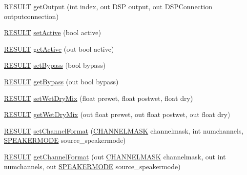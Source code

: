 \begin{DoxyCompactItemize}
\item 
\hyperlink{namespace_f_m_o_d_a305d1176ef3f8c8815861a60407ac33d}{R\+E\+S\+U\+LT} \hyperlink{class_f_m_o_d_1_1_d_s_p_ab9a4ff367880a3f11f0d9fd1b13b6471}{get\+Output} (int index, out \hyperlink{class_f_m_o_d_1_1_d_s_p}{D\+SP} output, out \hyperlink{class_f_m_o_d_1_1_d_s_p_connection}{D\+S\+P\+Connection} outputconnection)
\item 
\hyperlink{namespace_f_m_o_d_a305d1176ef3f8c8815861a60407ac33d}{R\+E\+S\+U\+LT} \hyperlink{class_f_m_o_d_1_1_d_s_p_a4550289d35ae8cbc8705b6336b8f9442}{set\+Active} (bool active)
\item 
\hyperlink{namespace_f_m_o_d_a305d1176ef3f8c8815861a60407ac33d}{R\+E\+S\+U\+LT} \hyperlink{class_f_m_o_d_1_1_d_s_p_a23023e1c53c97ab3a1931a4ec5a9ea5c}{get\+Active} (out bool active)
\item 
\hyperlink{namespace_f_m_o_d_a305d1176ef3f8c8815861a60407ac33d}{R\+E\+S\+U\+LT} \hyperlink{class_f_m_o_d_1_1_d_s_p_a4168480afea4775637ed9443046de78f}{set\+Bypass} (bool bypass)
\item 
\hyperlink{namespace_f_m_o_d_a305d1176ef3f8c8815861a60407ac33d}{R\+E\+S\+U\+LT} \hyperlink{class_f_m_o_d_1_1_d_s_p_a5fd30b33615332c87ed8f19975f910a5}{get\+Bypass} (out bool bypass)
\item 
\hyperlink{namespace_f_m_o_d_a305d1176ef3f8c8815861a60407ac33d}{R\+E\+S\+U\+LT} \hyperlink{class_f_m_o_d_1_1_d_s_p_a1e4aa96dc5b5082f506adbb913c1bc6f}{set\+Wet\+Dry\+Mix} (float prewet, float postwet, float dry)
\item 
\hyperlink{namespace_f_m_o_d_a305d1176ef3f8c8815861a60407ac33d}{R\+E\+S\+U\+LT} \hyperlink{class_f_m_o_d_1_1_d_s_p_ae5fffc548d67b21ba56c0c678e7d3a78}{get\+Wet\+Dry\+Mix} (out float prewet, out float postwet, out float dry)
\item 
\hyperlink{namespace_f_m_o_d_a305d1176ef3f8c8815861a60407ac33d}{R\+E\+S\+U\+LT} \hyperlink{class_f_m_o_d_1_1_d_s_p_a9e209a66e01c2373bc7d93e0a61a3afa}{set\+Channel\+Format} (\hyperlink{namespace_f_m_o_d_ae295945ff00acb5f2e5ef0b3f217f5e2}{C\+H\+A\+N\+N\+E\+L\+M\+A\+SK} channelmask, int numchannels, \hyperlink{namespace_f_m_o_d_aa0732e7e8efd3b96b526a7f2f8479634}{S\+P\+E\+A\+K\+E\+R\+M\+O\+DE} source\+\_\+speakermode)
\item 
\hyperlink{namespace_f_m_o_d_a305d1176ef3f8c8815861a60407ac33d}{R\+E\+S\+U\+LT} \hyperlink{class_f_m_o_d_1_1_d_s_p_afcba15be09b480630d20aa4312918723}{get\+Channel\+Format} (out \hyperlink{namespace_f_m_o_d_ae295945ff00acb5f2e5ef0b3f217f5e2}{C\+H\+A\+N\+N\+E\+L\+M\+A\+SK} channelmask, out int numchannels, out \hyperlink{namespace_f_m_o_d_aa0732e7e8efd3b96b526a7f2f8479634}{S\+P\+E\+A\+K\+E\+R\+M\+O\+DE} source\+\_\+speakermode)

\end{DoxyCompactItemize}
